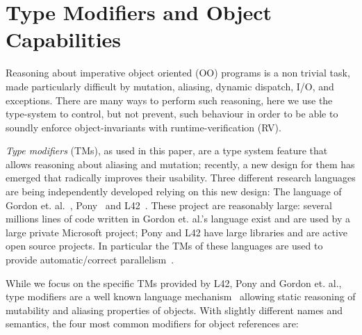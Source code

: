 \section{Type Modifiers and Object Capabilities}
\label{s:background}
Reasoning about imperative object oriented (OO) programs is a non trivial task,
made particularly difficult by mutation, aliasing, dynamic dispatch, I/O, and exceptions. There are many ways to perform such reasoning, here we use the type-system to control, but not prevent, such behaviour in order to be able to soundly enforce object-invariants with runtime-verification (RV).

\emph{Type modifiers} (TMs), as used in this paper, are a type system feature that allows reasoning about aliasing and mutation; recently, a new design for them has emerged that radically improves their usability.
Three different research languages are being independently developed relying on this new design: The language of Gordon et. al.~\cite{GordonEtAl12}, Pony~\cite{clebsch2015deny,clebsch2017orca} and L42~\cite{ServettoZucca15,ServettoEtAl13a,JOT:issue_2011_01/article1,GianniniEtAl16}.
These project are reasonably large: several millions lines of code written in Gordon et. al.'s language exist and are used by a large private Microsoft project; Pony and L42 have large libraries and are active open source projects. In particular the TMs of these languages are used to provide automatic/correct parallelism~\cite{GordonEtAl12,clebsch2015deny,clebsch2017orca,?}.

While we focus on the specific TMs provided by L42, Pony and Gordon et. al., type modifiers
 are a well known language mechanism~\cite{TschantzErnst05,BirkaErnst04,OstlundEtAl08,clebsch2015deny,GianniniEtAl16,GordonEtAl12}
 allowing static reasoning of mutability and aliasing properties of objects.
With slightly different names and semantics, the four most common modifiers for object references are:

